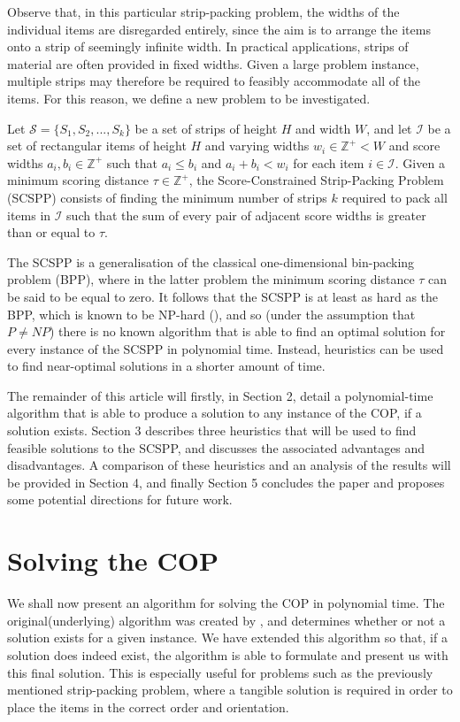\documentclass[oribibl]{llncs}
\begin{document}
Observe that, in this particular strip-packing problem, the widths of the individual items are disregarded entirely, since the aim is to arrange the items onto a strip of seemingly infinite width. In practical applications, strips of material are often provided in fixed widths. Given a large problem instance, multiple strips may therefore be required to feasibly accommodate all of the items. For this reason, we define a new problem to be investigated.

\begin{definition}
	\label{defn:scspp}
	Let $\mathcal{S} = \{S_1, S_2, ..., S_k\}$ be a set of strips of height $H$ and width $W$, and let $\mathcal{I}$ be a set of rectangular items of height $H$ and varying widths $w_i \in \mathbb{Z}^+ < W$ and score widths $a_i, b_i \in \mathbb{Z}^+$ such that $a_i \leq b_i$ and $a_i + b_i < w_i$ for each item $i \in \mathcal{I}$. Given a minimum scoring distance $\tau \in \mathbb{Z}^+$, the Score-Constrained Strip-Packing Problem (SCSPP) consists of finding the minimum number of strips $k$ required to pack all items in $\mathcal{I}$ such that the sum of every pair of adjacent score widths is greater than or equal to $\tau$.
\end{definition}

The SCSPP is a generalisation of the classical one-dimensional bin-packing problem (BPP), where in the latter problem the minimum scoring distance $\tau$ can be said to be equal to zero. It follows that the SCSPP is at least as hard as the BPP, which is known to be NP-hard (\citealp{garey1979}), and so (under the assumption that $P \neq NP$) there is no known algorithm that is able to find an optimal solution for every instance of the SCSPP in polynomial time. Instead, heuristics can be used to find near-optimal solutions in a shorter amount of time.

The remainder of this article will firstly, in Section 2, detail a polynomial-time algorithm that is able to produce a solution to any instance of the COP, if a solution exists. Section 3 describes three heuristics that will be used to find feasible solutions to the SCSPP, and discusses the associated advantages and disadvantages. A comparison of these heuristics and an analysis of the results will be provided in Section 4, and finally Section 5 concludes the paper and proposes some potential directions for future work.

\section{Solving the COP}
\label{sec:ahca}
We shall now present an algorithm for solving the COP in polynomial time. The original(underlying) algorithm was created by \cite{becker2010}, and determines whether or not a solution exists for a given instance. We have extended this algorithm so that, if a solution does indeed exist, the algorithm is able to formulate and present us with this final solution. This is especially useful for problems such as the previously mentioned strip-packing problem, where a tangible solution is required in order to place the items in the correct order and orientation.
\end{document}
